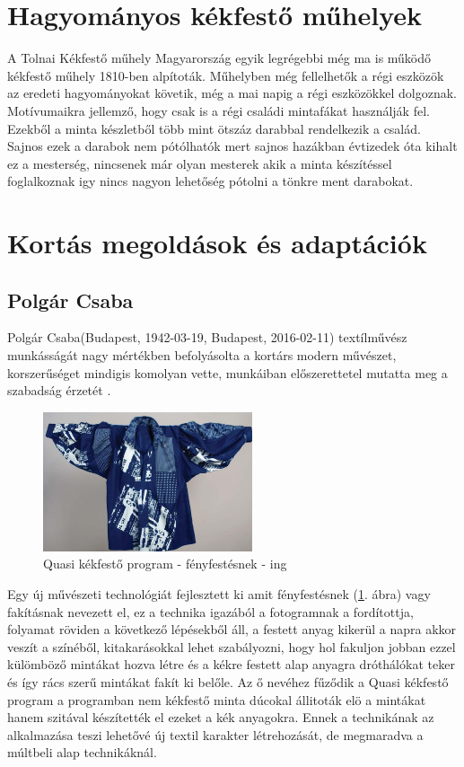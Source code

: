 \section{Hagyományos kékfestő műhelyek}
A Tolnai Kékfestő műhely Magyarország  egyik legrégebbi még ma is működő kékfestő műhely 1810-ben alpítoták.
Műhelyben még fellelhetők a régi eszközök az eredeti hagyományokat követik, még a mai napig a régi eszközökkel dolgoznak.
Motívumaikra jellemző, hogy csak is a régi családi mintafákat használják fel.
Ezekből a minta készletből több mint ötszáz darabbal rendelkezik a család.
Sajnos ezek a darabok nem pótólhatók mert sajnos hazákban évtizedek óta kihalt ez a mesterség, nincsenek már olyan mesterek akik a minta készítéssel foglalkoznak igy nincs nagyon lehetőség pótolni a tönkre 
ment darabokat.

\section{Kortás megoldások és adaptációk}

\subsection{Polgár Csaba}
Polgár Csaba(Budapest, 1942-03-19, Budapest, 2016-02-11) textílművész munkásságát nagy mértékben befolyásolta a kortárs modern művészet, korszerűséget mindigis komolyan vette, munkáiban előszerettetel mutatta meg a szabadság érzetét \cite{plogarcs}.

\begin{figure}[ht!]
	\centering
	\includegraphics[width=0.55\textwidth]{img/quasi.jpg}
	\caption{Quasi kékfestő program - fényfestésnek - ing}
	\label{fig:quasi}
\end{figure}

Egy új művészeti technológiát fejlesztett ki amit fényfestésnek (\ref{fig:quasi}. ábra) vagy fakításnak nevezett el, ez a technika igazából a fotogramnak a fordítottja, folyamat röviden  a következő lépésekből áll, a festett anyag kikerül a napra akkor veszít a színéből, kitakarásokkal lehet szabályozni, hogy hol fakuljon jobban ezzel külömböző
mintákat hozva létre és a kékre festett alap anyagra dróthálókat teker és így rács szerű mintákat fakít ki belőle.
Az ő nevéhez fűződik a Quasi kékfestő program  a programban nem  kékfestő minta dúcokal állitoták elö a mintákat hanem szitával készítették el ezeket a kék anyagokra. Ennek a technikának az alkalmazása teszi lehetővé új textil karakter  létrehozását, de megmaradva a múltbeli alap technikáknál.

